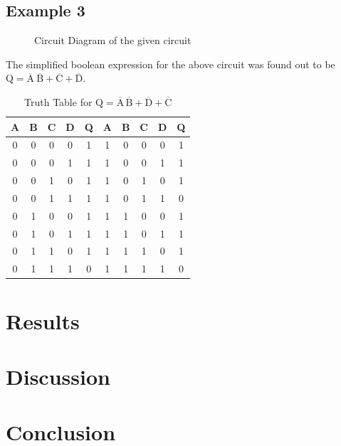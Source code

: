 \documentclass{scrartcl}
\newcommand{\1}{\mathbbm{1}}
\begin{document}
\subsection{Example 3}
\begin{figure}[H]
        \centering
        
        \caption{Circuit Diagram of the given circuit}
\end{figure}
The simplified boolean expression for the above circuit was found out to be
$\mathrm{Q = \overline{A}\ \overline{B}+ \overline{C} + \overline{D}}$.
\begin{table}[H]
        \centering
        \caption{Truth Table for \(\mathrm{ \mathrm{Q} = \overline{A}\,\overline{B} + \overline{D} + \overline{C} }\)}
        \vspace{0.2cm}
        \begin{tabular}{|c|c|c|c||c|||c|c|c|c||c|}
        \hline
        \textbf{A} & \textbf{B} & \textbf{C} & \textbf{D} & \textbf{Q} & \textbf{A} & \textbf{B} & \textbf{C} & \textbf{D} & \textbf{Q} \\
        \hline
        0 & 0 & 0 & 0 & 1 & 1 & 0 & 0 & 0 & 1 \\
        0 & 0 & 0 & 1 & 1 & 1 & 0 & 0 & 1 & 1 \\
        0 & 0 & 1 & 0 & 1 & 1 & 0 & 1 & 0 & 1 \\
        0 & 0 & 1 & 1 & 1 & 1 & 0 & 1 & 1 & 0 \\
        0 & 1 & 0 & 0 & 1 & 1 & 1 & 0 & 0 & 1 \\
        0 & 1 & 0 & 1 & 1 & 1 & 1 & 0 & 1 & 1 \\
        0 & 1 & 1 & 0 & 1 & 1 & 1 & 1 & 0 & 1 \\
        0 & 1 & 1 & 1 & 0 & 1 & 1 & 1 & 1 & 0 \\
        \hline
        \end{tabular}
\end{table}
\section{Results}
\section{Discussion}
\section{Conclusion}
\end{document}
